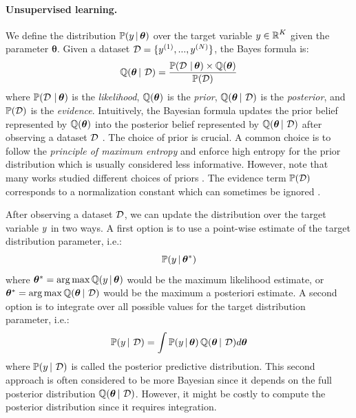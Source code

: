 \paragraph{Unsupervised learning.} We define the distribution $\mathbb{P}(y \,|\, \bm{\theta})$ over the target variable $y \in \operatorname{\mathbb{R}}^K$ given the parameter $\bm{\theta}$.
Given a dataset $\operatorname{\mathcal{D}}=\{y^{(1)}, ..., y^{(N)}\}$, the Bayes formula is:
\begin{equation}
    \operatorname{\mathbb{Q}}(\bm{\theta} \,|\, \operatorname{\mathcal{D}}) = \frac{\mathbb{P}(\operatorname{\mathcal{D}} \,|\, \bm{\theta}) \times \operatorname{\mathbb{Q}}(\bm{\theta})}{\mathbb{P}(\operatorname{\mathcal{D}})}
\end{equation}
where $\mathbb{P}(\operatorname{\mathcal{D}} \,|\, \bm{\theta})$ is the \emph{likelihood}, $\operatorname{\mathbb{Q}}(\bm{\theta})$ is the \emph{prior}, $\operatorname{\mathbb{Q}}(\bm{\theta} \,|\, \operatorname{\mathcal{D}})$ is the \emph{posterior}, and $\mathbb{P}(\operatorname{\mathcal{D}})$ is the \emph{evidence}.
Intuitively, the Bayesian formula updates the prior belief represented by $\operatorname{\mathbb{Q}}(\bm{\theta})$ into the posterior belief represented by $\operatorname{\mathbb{Q}}(\bm{\theta} \,|\, \operatorname{\mathcal{D}})$ after observing a dataset $\operatorname{\mathcal{D}}$ \cite{bishop}.
The choice of prior is crucial. A common choice is to follow the \emph{principle of maximum entropy} \citep{maximum-entropy-principle} and enforce high entropy for the prior distribution which is usually considered less informative. However, note that many works studied different choices of priors \cite{jeffreys1946prior, silvestro2020prior}.
The evidence term $\mathbb{P}(\operatorname{\mathcal{D}})$ corresponds to a normalization constant which can sometimes be ignored \cite{bishop}.

After observing a dataset $\operatorname{\mathcal{D}}$, we can update the distribution over the target variable $y$ in two ways.
A first option is to use a point-wise estimate of the target distribution parameter, i.e.:
\begin{equation}
    \mathbb{P}(y \,|\, \bm{\theta}^*)
\end{equation}
where $\bm{\theta}^*=\operatorname*{arg\,max}\operatorname{\mathbb{Q}}(y \,|\, \bm{\theta})$ would be the maximum likelihood estimate, or $\bm{\theta}^*=\operatorname*{arg\,max}\operatorname{\mathbb{Q}}(\bm{\theta} \,|\, \operatorname{\mathcal{D}})$ would be the maximum a posteriori estimate.
A second option is to integrate over all possible values for the target distribution parameter, i.e.:
\begin{equation}
    \label{eq:posterior_predictive}
    \mathbb{P}(y \,|\, \operatorname{\mathcal{D}}) = \int \mathbb{P}(y \,|\, \bm{\theta}) \operatorname{\mathbb{Q}}(\bm{\theta} \,|\, \operatorname{\mathcal{D}}) d\bm{\theta}
\end{equation}
where $\mathbb{P}(y \,|\, \operatorname{\mathcal{D}})$ is called the posterior predictive distribution. 
This second approach is often considered to be more Bayesian since it depends on the full posterior distribution $\operatorname{\mathbb{Q}}(\bm{\theta} \,|\, \operatorname{\mathcal{D}})$.
However, it might be costly to compute the posterior distribution since it requires integration.

